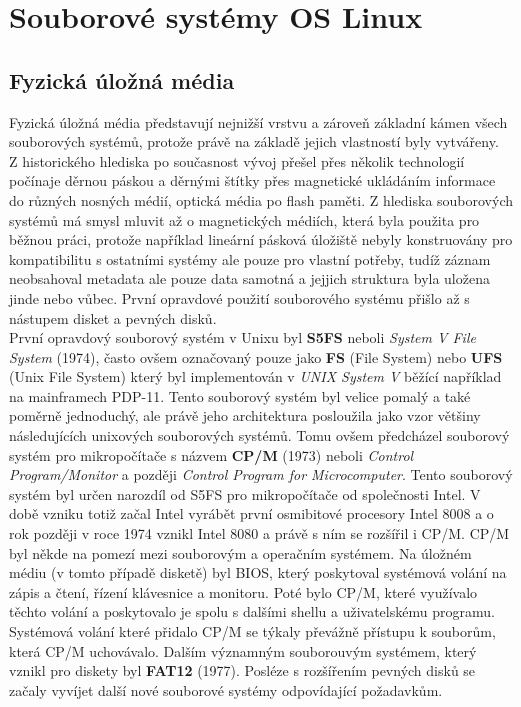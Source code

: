 \chapter{Souborové systémy OS Linux}

\section{Fyzická úložná média}
Fyzická úložná média představují nejnižší vrstvu  a zároveň základní kámen všech souborových systémů, protože právě na základě jejich vlastností byly vytvářeny.\\
Z historického hlediska po současnost vývoj přešel přes několik technologií počínaje děrnou páskou a děrnými štítky přes magnetické ukládáním informace do různých nosných médií, optická média po flash paměti. Z hlediska souborových systémů má smysl mluvit až o magnetických médiích, která byla použita pro běžnou práci, protože například lineární pásková úložiště nebyly konstruovány pro kompatibilitu s ostatními systémy ale pouze pro vlastní potřeby, tudíž záznam neobsahoval metadata ale pouze data samotná a jejjich struktura byla uložena jinde nebo vůbec. První opravdové použití souborového systému přišlo až s nástupem disket a pevných disků. \\
První opravdový souborový systém v Unixu byl \textbf{S5FS} neboli \emph{System V File System} (1974), často ovšem označovaný pouze jako \textbf{FS} (File System) nebo \textbf{UFS} (Unix File System) který byl implementován v \emph{UNIX System V} běžící například na mainframech PDP-11. Tento souborový systém byl velice pomalý a také poměrně jednoduchý, ale právě jeho architektura posloužila jako vzor většiny následujících unixových souborových systémů. Tomu ovšem předcházel souborový systém pro mikropočítače s názvem \textbf{CP/M} (1973) neboli \emph{Control Program/Monitor} a později \emph{Control Program for Microcomputer}. Tento souborový systém byl určen narozdíl od S5FS pro mikropočítače od společnosti Intel. V době vzniku totiž začal Intel vyrábět první osmibitové procesory Intel 8008 a o rok později v roce 1974 vznikl Intel 8080 a právě s ním se rozšířil i CP/M. CP/M byl někde na pomezí mezi souborovým a operačním systémem. Na úložném médiu (v tomto případě disketě) byl BIOS, který poskytoval systémová volání na zápis a čtení, řízení klávesnice a monitoru. Poté bylo CP/M, které využívalo těchto volání a poskytovalo je spolu s dalšími shellu a uživatelskému programu. Systémová volání které přidalo CP/M se týkaly převážně přístupu k souborům, která CP/M uchovávalo. Dalším významným souborouvým systémem, který vznikl pro diskety byl \textbf{FAT12} (1977). Posléze s rozšířením pevných disků se začaly vyvíjet další nové souborové systémy odpovídající požadavkům.\\
